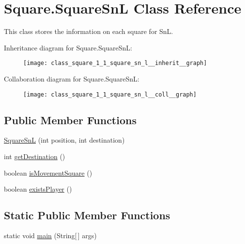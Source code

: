 \hypertarget{class_square_1_1_square_sn_l}{}\section{Square.\+Square\+Sn\+L Class Reference}
\label{class_square_1_1_square_sn_l}


This class stores the information on each square for Sn\+L.  




Inheritance diagram for Square.\+Square\+Sn\+L\+:
\nopagebreak
\begin{figure}[H]
\begin{center}
\leavevmode
\texttt{[image: class\_square\_1\_1\_square\_sn\_l\_\_inherit\_\_graph]}
\end{center}
\end{figure}


Collaboration diagram for Square.\+Square\+Sn\+L\+:
\nopagebreak
\begin{figure}[H]
\begin{center}
\leavevmode
\texttt{[image: class\_square\_1\_1\_square\_sn\_l\_\_coll\_\_graph]}
\end{center}
\end{figure}
\subsection*{Public Member Functions}
\begin{DoxyCompactItemize}
\item 
\hyperlink{class_square_1_1_square_sn_l_ac89482de8a579e2b2249f9d8bf652351}{Square\+Sn\+L} (int position, int destination)
\item 
int \hyperlink{class_square_1_1_square_sn_l_acb377b2ceb8dd5b8d65bba391f4c256d}{get\+Destination} ()
\item 
boolean \hyperlink{class_square_1_1_square_sn_l_ad948a877cff45a872082f23d72924770}{is\+Movement\+Square} ()
\item 
boolean \hyperlink{class_square_1_1_square_sn_l_a7f23505690a2a6ccfe9126448f66ddeb}{exists\+Player} ()
\end{DoxyCompactItemize}
\subsection*{Static Public Member Functions}
\begin{DoxyCompactItemize}
\item 
static void \hyperlink{class_square_1_1_square_sn_l_ac30c492a8a5c6f0f9bf43faa069dfa5c}{main} (String\mbox{[}$\,$\mbox{]} args)
\end{DoxyCompactItemize}
